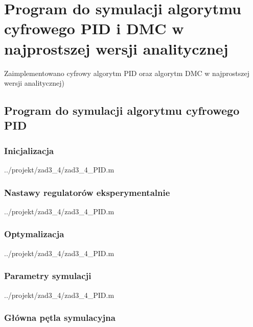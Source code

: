 \section{Program do symulacji algorytmu cyfrowego PID i DMC w najprostszej wersji analitycznej}
\label{projekt:zad3}

Zaimplementowano cyfrowy algorytm PID 
oraz algorytm DMC w najprostszej wersji analitycznej)


\subsection{Program do symulacji algorytmu cyfrowego PID}

\subsubsection{Inicjalizacja}

\ifdefined\CompileListings
    
        {../projekt/zad3_4/zad3_4_PID.m}
\fi

\subsubsection{Nastawy regulatorów eksperymentalnie}

\ifdefined\CompileListings
    
        {../projekt/zad3_4/zad3_4_PID.m}
    \newpage
\fi

\subsubsection{Optymalizacja}

\ifdefined\CompileListings
    
        {../projekt/zad3_4/zad3_4_PID.m}
\fi

\subsubsection{Parametry symulacji}

\ifdefined\CompileListings
    
        {../projekt/zad3_4/zad3_4_PID.m}
    \newpage
\fi

\subsubsection{Główna pętla symulacyjna}

